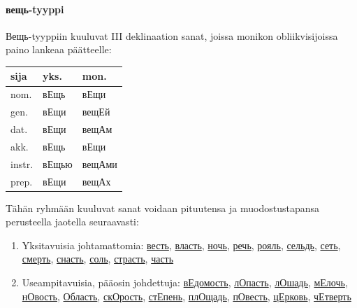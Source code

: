 \documentclass[]{scrartcl}
\providecommand{\tightlist}{%
  \setlength{\itemsep}{0pt}\setlength{\parskip}{0pt}}
\begin{document}
\paragraph{вещь-tyyppi}\label{ux432ux435ux449ux44c-tyyppi}

Вещь-tyyppiin kuuluvat III deklinaation sanat, joissa monikon
obliikvisijoissa paino lankeaa päätteelle:

\begin{longtable}[c]{@{}lll@{}}
\toprule
sija & yks. & mon.\tabularnewline
\midrule
\endhead
nom. & вЕщь & вЕщи\tabularnewline
gen. & вЕщи & вещЕй\tabularnewline
dat. & вЕщи & вещАм\tabularnewline
akk. & вЕщь & вЕщи\tabularnewline
instr. & вЕщью & вещАми\tabularnewline
prep. & вЕщи & вещАх\tabularnewline
\bottomrule
\end{longtable}

Tähän ryhmään kuuluvat sanat voidaan pituutensa ja muodostustapansa
perusteella jaotella seuraavasti:

\begin{enumerate}
\def\labelenumi{\arabic{enumi}.}
\tightlist
\item
  Yksitavuisia johtamattomia:
  \href{http://ru.wiktionary.org/wiki/весть}{весть},
  \href{http://ru.wiktionary.org/wiki/власть}{власть},
  \href{http://ru.wiktionary.org/wiki/ночь}{ночь},
  \href{http://ru.wiktionary.org/wiki/речь}{речь},
  \href{http://ru.wiktionary.org/wiki/рояль}{рояль},
  \href{http://ru.wiktionary.org/wiki/сельдь}{сельдь},
  \href{http://ru.wiktionary.org/wiki/сеть}{сеть},
  \href{http://ru.wiktionary.org/wiki/смерть}{смерть},
  \href{http://ru.wiktionary.org/wiki/снасть}{снасть},
  \href{http://ru.wiktionary.org/wiki/соль}{соль},
  \href{http://ru.wiktionary.org/wiki/страсть}{страсть},
  \href{http://ru.wiktionary.org/wiki/часть}{часть}
\item
  Useampitavuisia, pääosin johdettuja:
  \href{http://ru.wiktionary.org/wiki/ведомость}{вЕдомость},
  \href{http://ru.wiktionary.org/wiki/лопасть}{лОпасть},
  \href{http://ru.wiktionary.org/wiki/лошадь}{лОшадь},
  \href{http://ru.wiktionary.org/wiki/мелочь}{мЕлочь},
  \href{http://ru.wiktionary.org/wiki/новость}{нОвость},
  \href{http://ru.wiktionary.org/wiki/область}{Область},
  \href{http://ru.wiktionary.org/wiki/скорость}{скОрость},
  \href{http://ru.wiktionary.org/wiki/степень}{стЕпень},
  \href{http://ru.wiktionary.org/wiki/площадь}{плОщадь},
  \href{http://ru.wiktionary.org/wiki/повесть}{пОвесть},
  \href{http://ru.wiktionary.org/wiki/церковь}{цЕрковь},
  \href{http://ru.wiktionary.org/wiki/четверть}{чЕтверть}
\end{enumerate}
\end{document}
